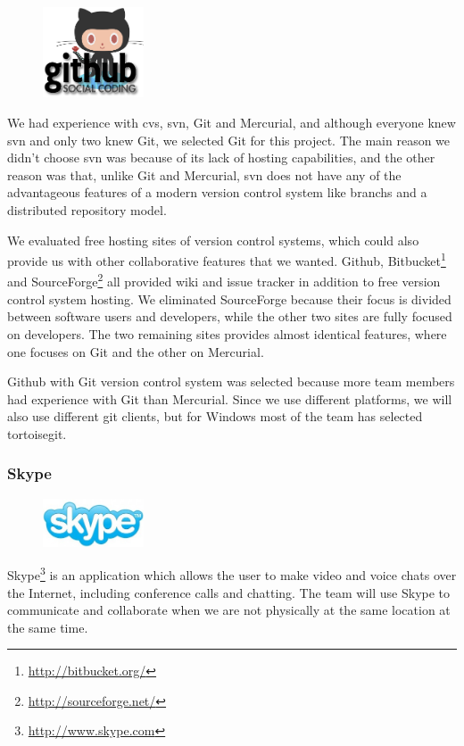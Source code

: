 \begin{figure}
	\vspace{-20pt}
	\includegraphics[width=3cm]{./planning/img/github_logo}
	\vspace{-20pt}
\end{figure}
We had experience with \Gls{cvs}, \Gls{svn}, Git and Mercurial, and although everyone 
knew \Gls{svn} and only two knew Git, we selected Git for this project.
The main reason we didn't choose \Gls{svn} was because of its lack of hosting capabilities,
and the other reason was that, unlike Git and Mercurial, \Gls{svn}	 does not have any of the
advantageous features of a modern \gls{version control system} like \glspl{branch} and a \gls{distributed
repository model}.

We evaluated free hosting sites of \glspl{version control system}, which could also 
provide us with other collaborative features that we wanted. Github, 
Bitbucket\footnote{\url{http://bitbucket.org/}} and
SourceForge\footnote{\url{http://sourceforge.net/}} all provided wiki and
issue tracker in addition to free \gls{version control system} hosting. We eliminated 
SourceForge because their focus is divided between software users and 
developers, while the other two sites are fully focused on developers. The 
two remaining sites provides almost identical features, where one focuses on 
Git and the other on Mercurial.

Github with Git \gls{version control system} was selected because more team members 
had experience with Git than Mercurial. Since we use different platforms,
we will also use different git clients, but for Windows most of the team has
selected tortoisegit.

\subsubsection{Skype}
\begin{figure}
	\vspace{-20pt}
	\includegraphics[width=3cm]{./planning/img/skype_logo}
	\vspace{-20pt}
\end{figure}
Skype\footnote{\url{http://www.skype.com}} is an application which allows the
user to make video and voice chats over the Internet, including conference
calls and chatting. The team will use Skype to communicate and collaborate when
we are not physically at the same location at the same time.

